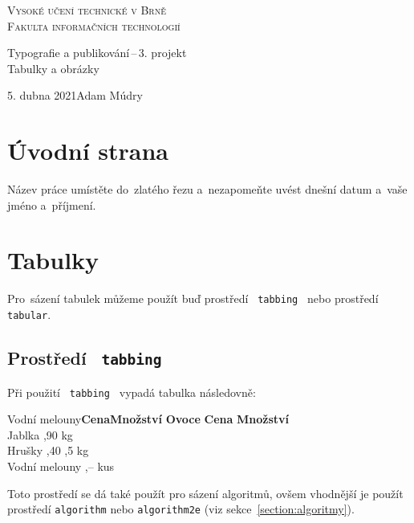 \documentclass[a4paper, 11pt]{article}
\author{Adam Múdry\\xmudry01@stud.fit.vutbr.cz}
\begin{document}
  \begin{titlepage}
    \begin{center}
      \renewcommand{\baselinestretch}{0.97}
      \Huge\textsc{Vysoké učení technické v Brně \\}
      \huge\textsc{Fakulta informačních technologií \\}
        

        \renewcommand{\baselinestretch}{1.02}

        \LARGE{Typografie a publikování{\,}--{\,}3. projekt \\}
        \Huge{Tabulky a obrázky \\}

      \renewcommand{\baselinestretch}{1}
    \end{center}
    {\Large{5. dubna 2021\hfill Adam Múdry}}
  \end{titlepage}

  \section{Úvodní strana}
  Název práce umístěte do~zlatého řezu a~nezapomeňte uvést dnešní datum a~vaše jméno a~příjmení.

  \section{Tabulky}
  Pro~sázení tabulek můžeme použít buď prostředí \texttt{ tabbing } nebo prostředí \texttt{ tabular}.

  \subsection{Prostředí \texttt{ tabbing}}
  Při použití \texttt{ tabbing } vypadá tabulka následovně:

  \begin{tabbing}
    Vodní melouny\quad \= \textbf{Cena}\quad \= \textbf{Množství}\kill
    \textbf{Ovoce}\> \textbf{Cena}\> \textbf{Množství} \\
    Jablka				,90				 kg   \\
    Hrušky				,40				,5 kg \\
    Vodní melouny	,--				 kus  \\
  \end{tabbing}
  Toto prostředí se dá také použít pro sázení algoritmů, ovšem vhodnější je použít prostředí \texttt{algorithm} nebo \texttt{algorithm2e} (viz sekce~\ref{section:algoritmy}).
\end{document}
